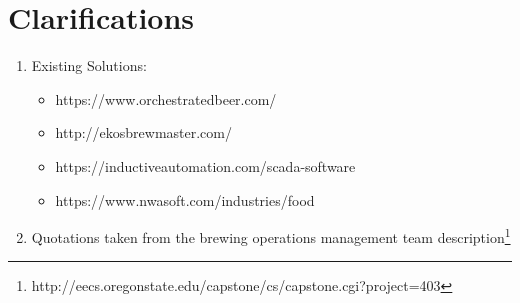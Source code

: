 \documentclass[draftclsnofoot,onecolumn,letterpaper,10pt]{IEEEtran}
\begin{document}
\section{\textbf{Clarifications}}
\begin{enumerate}
	\item {Existing Solutions:}
	\begin{itemize}
		\item {https://www.orchestratedbeer.com/}
		\item {http://ekosbrewmaster.com/}
		\item {https://inductiveautomation.com/scada-software}
		\item {https://www.nwasoft.com/industries/food}
	\end{itemize}
	\item {Quotations taken from the brewing operations management team description\footnote{http://eecs.oregonstate.edu/capstone/cs/capstone.cgi?project=403}}
\end{enumerate}
\end{document}
